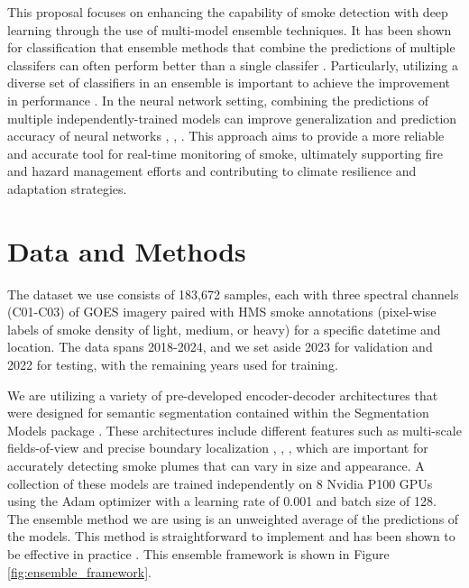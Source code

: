 \documentclass{article}
\begin{document}
This proposal focuses on enhancing the capability of smoke detection with deep learning through the use of multi-model ensemble techniques. It has been shown for classification that ensemble methods that combine the predictions of multiple classifers can often perform better than a single classifer \citep{ensemble-ml}. Particularly, utilizing a diverse set of classifiers in an ensemble is important to achieve the improvement in performance \citep{ensemble-diversity}. In the neural network setting, combining the predictions of multiple independently-trained models can improve generalization and prediction accuracy of neural networks \citep{nn-ensemble}, \citep{nn-ensemble2}, \citep{nn-error-ens}. This approach aims to provide a more reliable and accurate tool for real-time monitoring of smoke, ultimately supporting fire and hazard management efforts and contributing to climate resilience and adaptation strategies.

\section{Data and Methods}
The dataset we use consists of 183,672 samples, each with three spectral channels (C01-C03) of GOES imagery paired with HMS smoke annotations (pixel-wise labels of smoke density of light, medium, or heavy) for a specific datetime and location. The data spans 2018-2024, and we set aside 2023 for validation and 2022 for testing, with the remaining years used for training. 

We are utilizing a variety of pre-developed encoder-decoder architectures that were designed for semantic segmentation contained within the Segmentation Models package \citep{semantic}. These architectures include different features such as multi-scale fields-of-view and precise boundary localization \citep{dlv3p}, \citep{PAN}, \citep{UNetpp}, which are important for accurately detecting smoke plumes that can vary in size and appearance. A collection of these models are trained independently on 8 Nvidia P100 GPUs using the Adam optimizer with a learning rate of 0.001 and batch size of 128. 
The ensemble method we are using is an unweighted average of the predictions of the models. This method is straightforward to implement and has been shown to be effective in practice \citep{nn-ensemble2}. This ensemble framework is shown in Figure \ref{fig:ensemble_framework}. 
\end{document}
